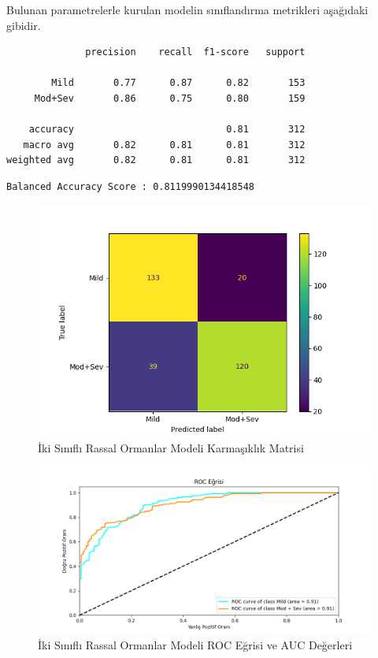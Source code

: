 \documentclass[12pt,twoside]{deuthesis}
\begin{document}
Bulunan parametrelerle kurulan modelin sınıflandırma metrikleri aşağıdaki gibidir.
\begin{verbatim}
              precision    recall  f1-score   support

        Mild       0.77      0.87      0.82       153
     Mod+Sev       0.86      0.75      0.80       159

    accuracy                           0.81       312
   macro avg       0.82      0.81      0.81       312
weighted avg       0.82      0.81      0.81       312
\end{verbatim}
\begin{verbatim}
Balanced Accuracy Score : 0.8119990134418548
\end{verbatim}
\begin{figure}

{\centering \includegraphics[width=1.05\linewidth,height=0.6\textheight]{figure/rf_bin_conf} 

}

\caption{İki Sınıflı Rassal Ormanlar Modeli Karmaşıklık Matrisi}\label{fig:unnamed-chunk-65}
\end{figure}
\begin{figure}

{\centering \includegraphics[width=1.05\linewidth,height=0.6\textheight]{figure/RandomForestClassifier_binary_roc} 

}

\caption{İki Sınıflı Rassal Ormanlar Modeli ROC Eğrisi ve AUC Değerleri}\label{fig:unnamed-chunk-66}
\end{figure}
\end{document}
